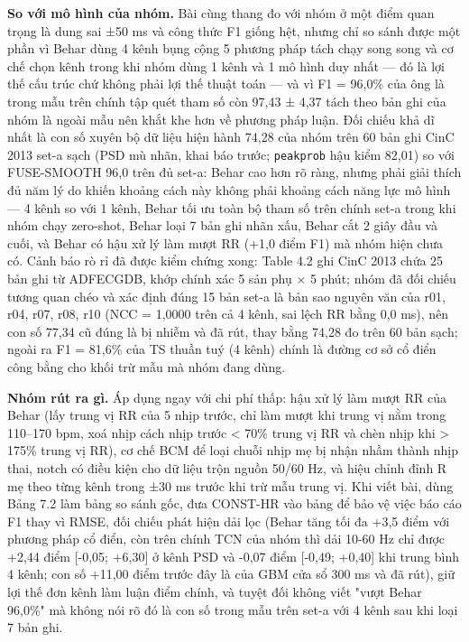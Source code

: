 \documentclass[12pt,a4paper]{article}
\begin{document}
\noindent \textbf{\color{tdtblue}So với mô hình của nhóm.} Bài cùng thang đo với nhóm ở một điểm quan trọng là dung sai ±50 ms và công thức F1 giống hệt, nhưng chỉ so sánh được một phần vì Behar dùng 4 kênh bụng cộng 5 phương pháp tách chạy song song và cơ chế chọn kênh trong khi nhóm dùng 1 kênh và 1 mô hình duy nhất — đó là lợi thế cấu trúc chứ không phải lợi thế thuật toán — và vì F1 = 96,0\% của ông là trong mẫu trên chính tập quét tham số còn 97,43 ± 4,37 tách theo bản ghi của nhóm là ngoài mẫu nên khắt khe hơn về phương pháp luận. Đối chiếu khả dĩ nhất là con số xuyên bộ dữ liệu hiện hành 74,28 của nhóm trên 60 bản ghi CinC 2013 set-a sạch (PSD mù nhãn, khai báo trước; \texttt{peakprob} hậu kiểm 82,01) so với FUSE-SMOOTH 96,0 trên đủ set-a: Behar cao hơn rõ ràng, nhưng phải giải thích đủ năm lý do khiến khoảng cách này không phải khoảng cách năng lực mô hình — 4 kênh so với 1 kênh, Behar tối ưu toàn bộ tham số trên chính set-a trong khi nhóm chạy zero-shot, Behar loại 7 bản ghi nhãn xấu, Behar cắt 2 giây đầu và cuối, và Behar có hậu xử lý làm mượt RR (+1,0 điểm F1) mà nhóm hiện chưa có. Cảnh báo rò rỉ đã được kiểm chứng xong: Table 4.2 ghi CinC 2013 chứa 25 bản ghi từ ADFECGDB, khớp chính xác 5 sản phụ × 5 phút; nhóm đã đối chiếu tương quan chéo và xác định đúng 15 bản set-a là bản sao nguyên văn của r01, r04, r07, r08, r10 (NCC = 1,0000 trên cả 4 kênh, sai lệch RR bằng 0,0 ms), nên con số 77,34 cũ đúng là bị nhiễm và đã rút, thay bằng 74,28 đo trên 60 bản sạch; ngoài ra F1 = 81,6\% của TS thuần tuý (4 kênh) chính là đường cơ sở cổ điển công bằng cho khối trừ mẫu mà nhóm đang dùng.\par\vspace{3pt}
\noindent \textbf{\color{tdtblue}Nhóm rút ra gì.} Áp dụng ngay với chi phí thấp: hậu xử lý làm mượt RR của Behar (lấy trung vị RR của 5 nhịp trước, chỉ làm mượt khi trung vị nằm trong 110–170 bpm, xoá nhịp cách nhịp trước < 70\% trung vị RR và chèn nhịp khi > 175\% trung vị RR), cơ chế BCM để loại chuỗi nhịp mẹ bị nhận nhầm thành nhịp thai, notch có điều kiện cho dữ liệu trộn nguồn 50/60 Hz, và hiệu chỉnh đỉnh R mẹ theo từng kênh trong ±30 ms trước khi trừ mẫu trung vị. Khi viết bài, dùng Bảng 7.2 làm bảng so sánh gốc, đưa CONST-HR vào bảng để bảo vệ việc báo cáo F1 thay vì RMSE, đối chiếu phát hiện dải lọc (Behar tăng tối đa +3,5 điểm với phương pháp cổ điển, còn trên chính TCN của nhóm thì dải 10-60 Hz chỉ được +2,44 điểm [-0,05; +6,30] ở kênh PSD và -0,07 điểm [-0,49; +0,40] khi trung bình 4 kênh; con số +11,00 điểm trước đây là của GBM cửa sổ 300 ms và đã rút), giữ lợi thế đơn kênh làm luận điểm chính, và tuyệt đối không viết "vượt Behar 96,0\%" mà không nói rõ đó là con số trong mẫu trên set-a với 4 kênh sau khi loại 7 bản ghi.\par\vspace{3pt}
\vspace{6pt}
\end{document}
